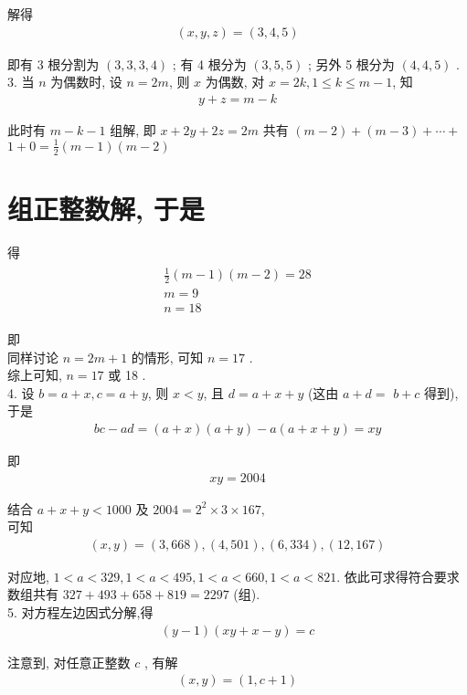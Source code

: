 解得
\begin{align*}
	(x, y, z)=(3,4,5)
\end{align*}

即有 3 根分割为 $(3,3,3,4)$ ; 有 4 根分为 $(3,5,5)$ ; 另外 5 根分为 $(4,4,5)$ . \\
3. 当 $n$ 为偶数时, 设 $n=2 m$, 则 $x$ 为偶数, 对 $x=2 k, 1 \leqslant k \leqslant m-1$, 知
\begin{align*}
	y+z=m-k
\end{align*}

此时有 $m-k-1$ 组解, 即 $x+2 y+2 z=2 m$ 共有 $(m-2)+(m-3)+\cdots+$ $1+0=\frac{1}{2}(m-1)(m-2)$

\section{组正整数解, 于是}
得
\begin{align*}
	\begin{gathered}
		\frac{1}{2}(m-1)(m-2)=28 \\
		m=9 \\
		n=18
	\end{gathered}
\end{align*}

即\\
同样讨论 $n=2 m+1$ 的情形, 可知 $n=17$ . \\
综上可知,  $n=17$ 或 18 . \\
4. 设 $b=a+x, c=a+y$, 则 $x<y$, 且 $d=a+x+y$ (这由 $a+d=$ $b+c$ 得到), 于是
\begin{align*}
	b c-a d=(a+x)(a+y)-a(a+x+y)=x y
\end{align*}

即
\begin{align*}
	x y=2004
\end{align*}

结合 $a+x+y<1000$ 及 $2004=2^{2} \times 3 \times 167 , $\\
可知
\begin{align*}
	(x, y)=(3,668),(4,501),(6,334),(12,167)
\end{align*}

对应地,  $1<a<329,1<a<495,1<a<660,1<a<821$. 依此可求得符合要求数组共有 $327+493+658+819=2297$ (组). \\
5. 对方程左边因式分解,得
\begin{align*}
	(y-1)(x y+x-y)=c
\end{align*}

注意到, 对任意正整数 $c$ , 有解
\begin{align*}
	(x, y)=(1, c+1)
\end{align*}

